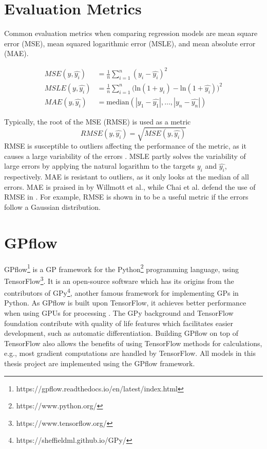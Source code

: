 \section{Evaluation Metrics}
Common evaluation metrics when comparing regression models are mean square error (MSE), mean squared logarithmic error (MSLE), and mean absolute error (MAE).

\begin{align}
    MSE(y, \hat{y_i}) &= \frac{1}{n} \sum_{i=1}^{n} (y_i - \hat{y_i})^2 \label{eq:rmse} \\
    MSLE(y, \hat{y_i}) &= \frac{1}{n} \sum_{i=1}^{n} \big( \textrm{ln}(1+y_i) - \textrm{ln}(1+\hat{y_i}) \big)^2 \label{eq:msle} \\
    MAE(y, \hat{y_i}) &= \textrm{median}(|y_1-\hat{y_1}|, \ldots, |y_n-\hat{y_n}|)\label{eq:mae}
\end{align}

Typically, the root of the MSE (RMSE) is used as a metric
\begin{equation}
    RMSE(y, \hat{y_i}) = \sqrt{MSE(y, \hat{y_i})}
\end{equation}
RMSE is susceptible to outliers affecting the performance of the metric, as it causes a large variability of the errors \cite{Willmott2005}.
MSLE partly solves the variability of large errors by applying the natural logarithm to the targets $y_i$ and $\hat{y_i}$, respectively.
MAE is resistant to outliers, as it only looks at the median of all errors.
MAE is praised in \cite{Willmott2005} by Willmott et al., while Chai et al. defend the use of RMSE in \cite{Chai2014}.
For example, RMSE is shown in \cite{Chai2014} to be a useful metric if the errors follow a Gaussian distribution.

\section{GPflow}
GPflow\footnote{https://gpflow.readthedocs.io/en/latest/index.html} \cite{GPflow2017} is a GP framework for the Python\footnote{https://www.python.org/} programming language, using TensorFlow\footnote{https://www.tensorflow.org/}.
It is an open-source software which has its origins from the contributors of GPy\footnote{https://sheffieldml.github.io/GPy/}, another famous framework for implementing GPs in Python.
As GPflow is built upon TensorFlow, it achieves better performance when using GPUs for processing \cite{GPflow2017}.
The GPy background and TensorFlow foundation contribute with quality of life features which facilitates easier development, such as automatic differentiation. 
Building GPflow on top of TensorFlow also allows the benefits of using TensorFlow methods for calculations, e.g., most gradient computations are handled by TensorFlow.
All models in this thesis project are implemented using the GPflow framework.

